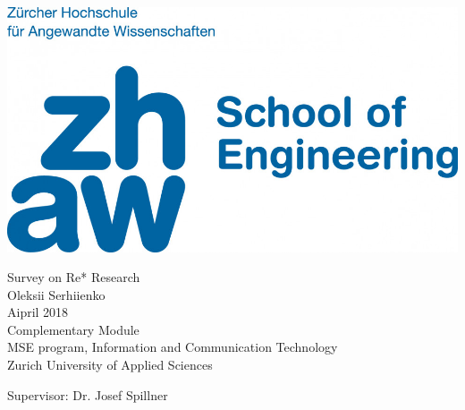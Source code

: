 \thispagestyle{empty}
\includegraphics[scale=0.2]{fig/Logo-ZHAW.jpg}
\mbox{}\\[6pc]
\begin{center}
\Huge{Survey on Re* Research}\\[2pc]

\Large{Oleksii Serhiienko}\\[1pc]
\large{Aipril 2018}\\[2pc]

Complementary Module\\
MSE program, Information and Communication Technology\\
Zurich University of Applied Sciences
\end{center}
\vfill

\noindent Supervisor: Dr. Josef Spillner



